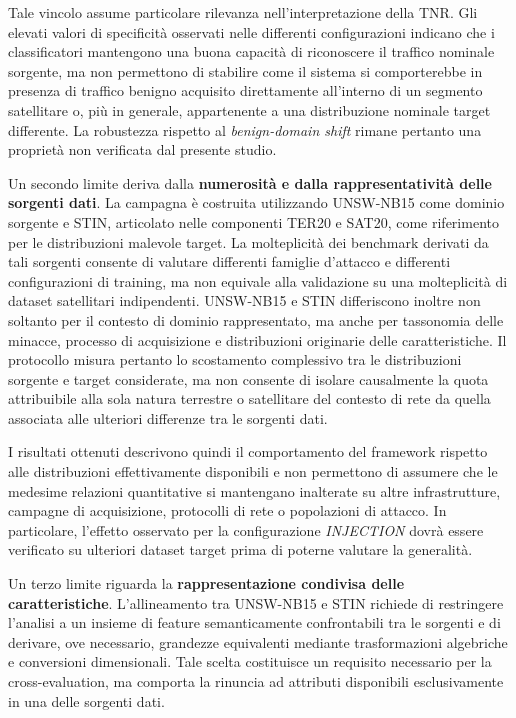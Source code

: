 Tale vincolo assume particolare rilevanza nell'interpretazione della TNR.
Gli elevati valori di specificità osservati nelle differenti configurazioni indicano che i classificatori mantengono una buona capacità di riconoscere il traffico nominale sorgente, ma non permettono di stabilire come il sistema si comporterebbe in presenza di traffico benigno acquisito direttamente all'interno di un segmento satellitare o, più in generale, appartenente a una distribuzione nominale target differente.
La robustezza rispetto al \textit{benign-domain shift} rimane pertanto una proprietà non verificata dal presente studio.

Un secondo limite deriva dalla \textbf{numerosità e dalla rappresentatività delle sorgenti dati}.
La campagna è costruita utilizzando UNSW-NB15 come dominio sorgente e STIN, articolato nelle componenti TER20 e SAT20, come riferimento per le distribuzioni malevole target.
La molteplicità dei benchmark derivati da tali sorgenti consente di valutare differenti famiglie d'attacco e differenti configurazioni di training, ma non equivale alla validazione su una molteplicità di dataset satellitari indipendenti.
UNSW-NB15 e STIN differiscono inoltre non soltanto per il contesto di dominio rappresentato, ma anche per tassonomia delle minacce, processo di acquisizione e distribuzioni originarie delle caratteristiche. Il protocollo misura pertanto lo scostamento complessivo tra le distribuzioni sorgente e target considerate, ma non consente di isolare causalmente la quota attribuibile alla sola natura terrestre o satellitare del contesto di rete da quella associata alle ulteriori differenze tra le sorgenti dati.

I risultati ottenuti descrivono quindi il comportamento del framework rispetto alle distribuzioni effettivamente disponibili e non permettono di assumere che le medesime relazioni quantitative si mantengano inalterate su altre infrastrutture, campagne di acquisizione, protocolli di rete o popolazioni di attacco.
In particolare, l'effetto osservato per la configurazione \textit{INJECTION} dovrà essere verificato su ulteriori dataset target prima di poterne valutare la generalità.

Un terzo limite riguarda la \textbf{rappresentazione condivisa delle caratteristiche}.
L'allineamento tra UNSW-NB15 e STIN richiede di restringere l'analisi a un insieme di feature semanticamente confrontabili tra le sorgenti e di derivare, ove necessario, grandezze equivalenti mediante trasformazioni algebriche e conversioni dimensionali.
Tale scelta costituisce un requisito necessario per la cross-evaluation, ma comporta la rinuncia ad attributi disponibili esclusivamente in una delle sorgenti dati.

